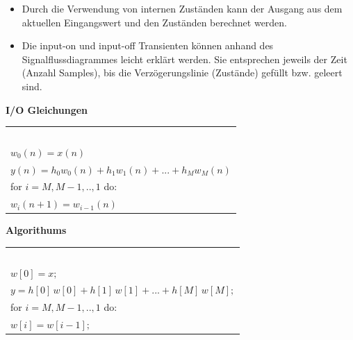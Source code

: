 		\begin{itemize}
		 \item Durch die Verwendung von internen Zuständen kann der Ausgang aus dem aktuellen Eingangswert und den Zuständen berechnet werden.
		 \item Die input-on und input-off Transienten können anhand des Signalflussdiagrammes leicht erklärt werden. Sie entsprechen jeweils der Zeit (Anzahl Samples), bis die Verzögerungslinie (Zustände) gefüllt bzw. geleert sind.\\[-0.2cm]
		\end{itemize}
		\begin{minipage}{0.5\textwidth}
			\textbf{I/O Gleichungen}\\[0.2cm]
			\begin{tabular}{|l|}
			\hline $ $\\[-0.3cm]
				$w_0(n) = x(n)$\\
				$y(n) = h_0w_0(n) + h_1w_1(n) + ... + h_Mw_M(n)$\\[0.2cm]
				for $i = M,M-1,..,1$ do:\\
				$w_i(n+1) = w_{i-1}(n)$\\[0.2cm]
			\hline     
			\end{tabular}
		\end{minipage}
		\begin{minipage}{0.4\textwidth}
			\textbf{Algorithums}\\[0.2cm]
			\begin{tabular}{|l|}
			\hline $ $\\[-0.3cm]
				$w[0] = x;$\\
				$y = h[0]\,w[0] + h[1]\,w[1] + ... + h[M]\,w[M]; $\\[0.2cm]
				for $i = M,M-1,..,1$ do:\\
				$w[i] = w[i-1];$\\[0.2cm]
			\hline     
			\end{tabular} 
		\end{minipage}